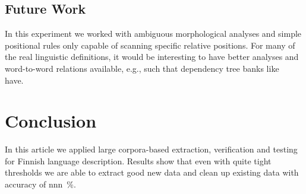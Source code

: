 \documentclass[a5paper]{article}
\begin{document}
\subsection{Future Work}

In this experiment we worked with ambiguous morphological analyses and simple
positional rules only capable of scanning specific relative
positions. For many of the real linguistic definitions, it would be interesting
to have better analyses and word-to-word relations available, e.g., such that
dependency tree banks like~\cite{haverinen2013building} have.

\section{Conclusion}

In this article we applied large corpora-based extraction, verification and
testing for Finnish language description. Results show that even with quite
tight thresholds we are able to extract good new data and clean up existing
data with accuracy of nnn~\%.



\end{document}
